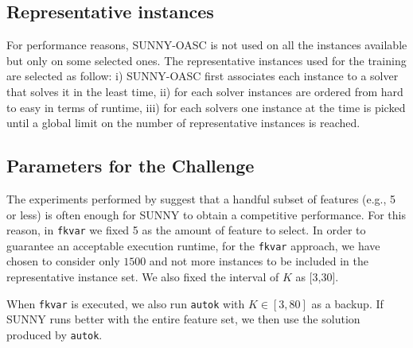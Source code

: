 \documentclass[tablecaption=bottom,wcp]{jmlr} %
\newcommand{\TODO}[1]{\textcolor{red}{#1}}
\begin{document}
\subsection{Representative instances}
For performance reasons, SUNNY-OASC is not used on all the instances available 
but only on some selected ones.
The representative instances used for the training are selected as follow: i) 
SUNNY-OASC first associates each instance to a solver that solves it in the 
least time, ii) for each solver instances are ordered from hard to easy in terms 
of runtime, iii) for each solvers one instance at the time is picked until a 
global limit on the number of representative instances is reached.

\subsection{Parameters for the Challenge}
The experiments performed by \cite{ictai_paper} suggest that a handful subset 
of features (e.g., 5 or less) is often enough for SUNNY to obtain a 
competitive performance. For this reason, in \texttt{fkvar} we fixed 
5 as the amount of feature to select. In order to guarantee an acceptable 
execution runtime, for the \texttt{fkvar} approach, we have chosen to 
consider only $1500$ and not more instances to be included in the 
representative instance set. We also fixed the interval of $K$ as [3,30]. 



When \texttt{fkvar} is executed, we also run 
\texttt{autok} with $K \in [3,80]$ as a backup. If SUNNY runs better with the 
entire feature set, we then use the solution produced by \texttt{autok}.
\end{document}
